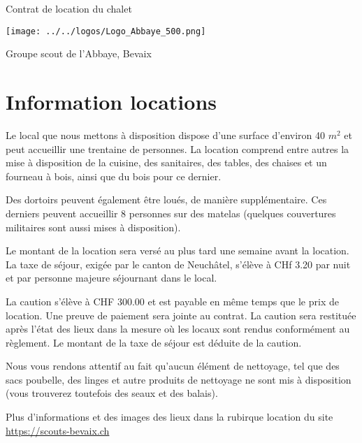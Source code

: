 \documentclass[a4paper,12pt]{extarticle}
\begin{document}
\pagestyle{fancy}
\fancyhead{}
\fancyfoot{}
\fancyfoot[RO,RE]{\thepage}


\begin{titlepage}
    \begin{center}
        \Huge Contrat de location du chalet

        \vspace{3cm}
        \texttt{[image: ../../logos/Logo\_Abbaye\_500.png]}
        \vspace{3cm}

        \huge Groupe scout de l'Abbaye, Bevaix 
    \end{center}
\end{titlepage}


\section{Information locations}

Le local que nous mettons à disposition dispose d'une surface d'environ 40 $m^2$ et peut accueillir une trentaine de personnes.
La location comprend entre autres la mise à disposition de la cuisine, des sanitaires, des tables, des chaises et un fourneau à bois, ainsi que du bois pour ce dernier.

Des dortoirs peuvent également être loués, de manière supplémentaire.
Ces derniers peuvent accueillir 8 personnes sur des matelas (quelques couvertures militaires sont aussi mises à disposition).

Le montant de la location sera versé au plus tard une semaine avant la location. La taxe de séjour, exigée par le canton de Neuchâtel, s'élève à CHf 3.20 par nuit et par personne majeure séjournant dans le local.

La caution s'élève à CHF 300.00 et est payable en même temps que le prix de location. Une preuve de paiement sera jointe au contrat. La caution sera restituée après l'état des lieux dans la mesure où les locaux sont rendus conformément au règlement. Le montant de la taxe de séjour est déduite de la caution.

Nous vous rendons attentif au fait qu'aucun élément de nettoyage, tel que des sacs poubelle, des linges et autre produits de nettoyage ne sont mis à disposition (vous trouverez toutefois des seaux et des balais).

Plus d'informations et des images des lieux dans la rubirque location du site \url{https://scouts-bevaix.ch}
\end{document}
